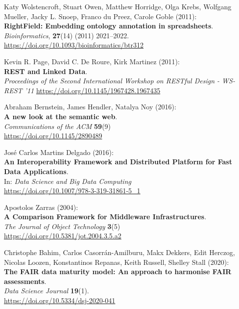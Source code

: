 \begin{thebibliography}{9}
Katy Wolstencroft, Stuart Owen, Matthew Horridge, Olga Krebs, Wolfgang Mueller, Jacky L. Snoep, Franco du Preez, Carole Goble (2011): \\
\textbf{RightField: Embedding ontology annotation in spreadsheets}. \\
\emph{Bioinformatics}, \textbf{27}(14) (2011)
2021--2022.
\url{https://doi.org/10.1093/bioinformatics/btr312}

Kevin R. Page, David C. De Roure, Kirk Martinez (2011): \\
\textbf{{REST} and {Linked Data}}. \\
\emph{Proceedings of the {Second International Workshop} on {RESTful Design} - {WS-REST} '11} 
\url{https://doi.org/10.1145/1967428.1967435}

Abraham Bernstein, James Hendler, Natalya Noy (2016): \\
\textbf{A new look at the semantic web}. \\
\emph{Communications of the ACM} \textbf{59}(9) \\
\url{https://doi.org/10.1145/2890489}

José Carlos Martins Delgado (2016): \\
\textbf{An Interoperability Framework and Distributed Platform for Fast Data Applications}.\\
In: \emph{Data {Science} and {Big Data Computing}} \\
\url{https://doi.org/10.1007/978-3-319-31861-5_1}

Apostolos Zarras (2004): \\
\textbf{A {Comparison Framework} for {Middleware Infrastructures}}. \\
\emph{The Journal of Object Technology} \textbf{3}(5) \\
\url{https://doi.org/10.5381/jot.2004.3.5.a2}

Christophe Bahim, Carlos Casorrán-Amilburu, Makx Dekkers, Edit Herczog,
Nicolas Loozen, Konstantinos Repanas, Keith Russell, Shelley Stall
(2020): \\
\textbf{The {FAIR} data maturity model: {An} approach to harmonise
{FAIR} assessments}. \\
\emph{Data Science Journal} \textbf{19}(1).\\
\url{https://doi.org/10.5334/dsj-2020-041}


\end{thebibliography}
